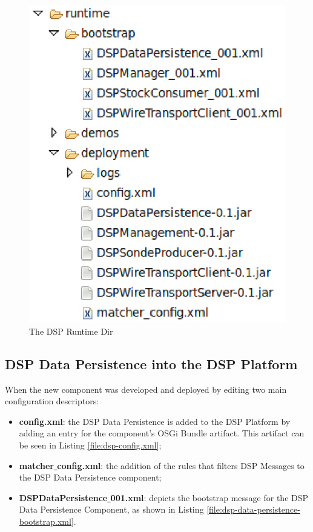 \begin{figure}[!h]
  \centering
  \includegraphics[scale=0.65]{../diagrams/dsp-runtime-dir}
  \caption{The DSP Runtime Dir}
  \label{fig:dsp-runtime-dir}
\end{figure}

\subsection{DSP Data Persistence into the DSP Platform}
\label{sec:dsp-persistence-boostrap}

When the new component was developed and deployed by editing two main
configuration descriptors:

\begin{itemize}
  \item \textbf{config.xml}: the DSP Data Persistence is added to the DSP
  Platform by adding an entry for the component's OSGi Bundle artifact. This
  artifact can be seen in Listing \ref{file:dsp-config.xml};
  \item \textbf{matcher\underline{ }config.xml}: the addition of the rules that
  filters DSP Messages to the DSP Data Persistence component;
  \item \textbf{DSPDataPersistence\underline{ }001.xml}: depicts the bootstrap
  message for the DSP Data Persistence Component, as shown in Listing 
  \ref{file:dsp-data-persistence-bootstrap.xml}.
\end{itemize}

